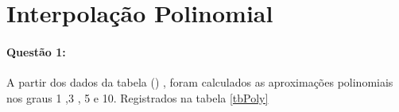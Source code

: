 \documentclass[a4paper,11pt]{article}
\title{\tituloCapa}
\begin{document}


\section{Interpolação Polinomial}
\paragraph{Questão 1:}A partir dos dados da tabela () , foram calculados as aproximações polinomiais nos graus 1 ,3 , 5  e 10. Registrados na tabela \ref{tbPoly}

\end{document}
